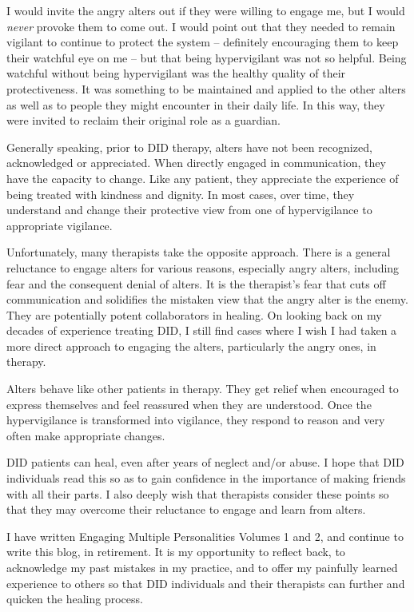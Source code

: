 \documentclass[]{book}
\begin{document}
I would invite the angry alters out if they were willing to engage me, but I would \emph{never} provoke them to come out. I would point out that they needed to remain vigilant to continue to protect the system -- definitely encouraging them to keep their watchful eye on me -- but that being hypervigilant was not so helpful. Being watchful without being hypervigilant was the healthy quality of their protectiveness. It was something to be maintained and applied to the other alters as well as to people they might encounter in their daily life. In this way, they were invited to reclaim their original role as a guardian.

Generally speaking, prior to DID therapy, alters have not been recognized, acknowledged or appreciated. When directly engaged in communication, they have the capacity to change. Like any patient, they appreciate the experience of being treated with kindness and dignity. In most cases, over time, they understand and change their protective view from one of hypervigilance to appropriate vigilance.

Unfortunately, many therapists take the opposite approach. There is a general reluctance to engage alters for various reasons, especially angry alters, including fear and the consequent denial of alters. It is the therapist's fear that cuts off communication and solidifies the mistaken view that the angry alter is the enemy. They are potentially potent collaborators in healing. On looking back on my decades of experience treating DID, I still find cases where I wish I had taken a more direct approach to engaging the alters, particularly the angry ones, in therapy.

Alters behave like other patients in therapy. They get relief when encouraged to express themselves and feel reassured when they are understood. Once the hypervigilance is transformed into vigilance, they respond to reason and very often make appropriate changes.

DID patients can heal, even after years of neglect and/or abuse. I hope that DID individuals read this so as to gain confidence in the importance of making friends with all their parts. I also deeply wish that therapists consider these points so that they may overcome their reluctance to engage and learn from alters.

I have written Engaging Multiple Personalities Volumes 1 and 2, and continue to write this blog, in retirement. It is my opportunity to reflect back, to acknowledge my past mistakes in my practice, and to offer my painfully learned experience to others so that DID individuals and their therapists can further and quicken the healing process.
\end{document}
